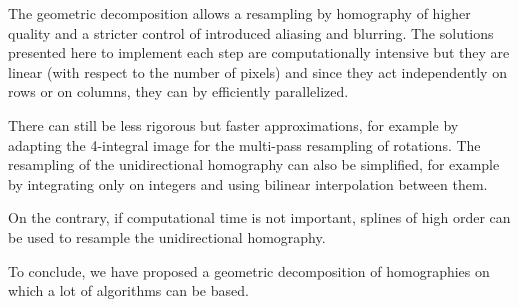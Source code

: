 









The geometric decomposition allows a resampling by homography of higher quality and a stricter control of introduced aliasing and blurring. The solutions presented here to implement each step are computationally intensive but they are linear (with respect to the number of pixels) and since they act independently on rows or on columns, they can by efficiently parallelized.

There can still be less rigorous but faster approximations, for example by adapting the 4-integral image for the multi-pass resampling of rotations. The resampling of the unidirectional homography can also be simplified, for example by integrating only on integers and using bilinear interpolation between them.

On the contrary, if computational time is not important, splines of high order can be used to resample the unidirectional homography.

To conclude, we have proposed a geometric decomposition of homographies on which a lot of algorithms can be based.

